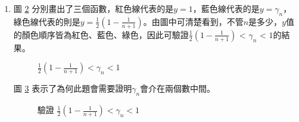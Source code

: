 \documentclass[12pt, a4paper]{article}
\begin{document}
\begin{enumerate}
\begin{figure}[H]
\end{figure}
\begin{figure}[H]
    \caption{於markdown紀錄運算過程}
    \label{fig:markdownriemannsum}
\end{figure}
此小題較特殊的程式碼：
\begin{lstlisting}[language=Python]
#  開始一個循環，從0到9，這將用於繪製填充區域。
for i in range(0, 10):
#  創建一個NumPy數組x，它包含一系列連續數，從"1+i"到"2+i"，間隔為0.1。
    x = np.arange(1 + i, 2 + i, 0.1)
#  創建一個NumPy數組y，其中每個元素是對應x數組中元素的倒數。
    y = 1/x
#  創建一個長度為10的NumPy數組g，其中的每個元素都是(1/i+1))的值
    g = [1/(i + 1)] * 10
#  繪製一個填充區域，這個區域的x值由x數組確定，y值由y數組確定，填充的底部由g數組確定。填充區域的顏色設置為（橙色）並設置透明度為0.5。
    ax.fill_between(x, y, g, color='#FF8C00', alpha=0.5)
#  設置標註於圖中想要的位置。
ax.text(1.0,1.5,'$f(x)=\\frac{1}{x}$',fontsize='12')
ax.text(5,0.75,'$\gamma_n$ = orange area',fontsize='12')
\end{lstlisting}
\newpage
\item 圖 \ref{fig:gamman_1} 分別畫出了三個函數，紅色線代表的是$y=1$，藍色線代表的是$y=\gamma_n$，綠色線代表的則是$y=\frac{1}{2}(1-\frac{1}{n+1})$。由圖中可清楚看到，不管$n$是多少，$y$值的顏色順序皆為紅色、藍色、綠色，因此可驗證$\frac{1}{2}(1-\frac{1}{n+1})$ < $\gamma_n $ < $1$的結果。
\begin{figure}[H]
    \caption{$\frac{1}{2}(1-\frac{1}{n+1})<\gamma_n < 1$}
    \label{fig:gamman_1}
\end{figure}
圖 \ref{fig:gamman_2} 表示了為何此題會需要證明$\gamma_n$會介在兩個數中間。
\begin{figure}[h]
    \caption{驗證 $\frac{1}{2}(1-\frac{1}{n+1})<\gamma_n < 1$}
    \label{fig:gamman_2}
\end{figure}
\end{enumerate}
\newpage
\end{document}
